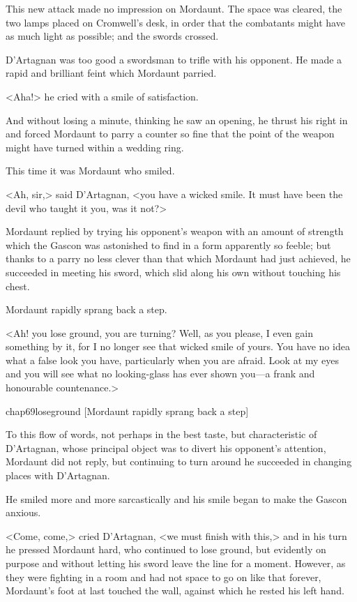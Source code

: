 This new attack made no impression on Mordaunt. The space was cleared, the two lamps placed on Cromwell's desk, in order that the combatants might have as much light as possible; and the swords crossed.

D'Artagnan was too good a swordsman to trifle with his opponent. He made a rapid and brilliant feint which Mordaunt parried.

<Aha!> he cried with a smile of satisfaction.

And without losing a minute, thinking he saw an opening, he thrust his right in and forced Mordaunt to parry a counter  so fine that the point of the weapon might have turned within a wedding ring.

This time it was Mordaunt who smiled.

<Ah, sir,> said D'Artagnan, <you have a wicked smile. It must have been the devil who taught it you, was it not?>

Mordaunt replied by trying his opponent's weapon with an amount of strength which the Gascon was astonished to find in a form apparently so feeble; but thanks to a parry no less clever than that which Mordaunt had just achieved, he succeeded in meeting his sword, which slid along his own without touching his chest.

Mordaunt rapidly sprang back a step.

<Ah! you lose ground, you are turning? Well, as you please, I even gain something by it, for I no longer see that wicked smile of yours. You have no idea what a false look you have, particularly when you are afraid. Look at my eyes and you will see what no looking-glass has ever shown you—a frank and honourable countenance.>

\begin{bwbigpic}
	[\basicscale] 
	{chap69loseground}
	[Mordaunt rapidly sprang back a step]
\end{bwbigpic}

To this flow of words, not perhaps in the best taste, but characteristic of D'Artagnan, whose principal object was to divert his opponent's attention, Mordaunt did not reply, but continuing to turn around he succeeded in changing places with D'Artagnan.

He smiled more and more sarcastically and his smile began to make the Gascon anxious.

<Come, come,> cried D'Artagnan, <we must finish with this,> and in his turn he pressed Mordaunt hard, who continued to lose ground, but evidently on purpose and without letting his sword leave the line for a moment. However, as they were fighting in a room and had not space to go on like that forever, Mordaunt's foot at last touched the wall, against which he rested his left hand.

